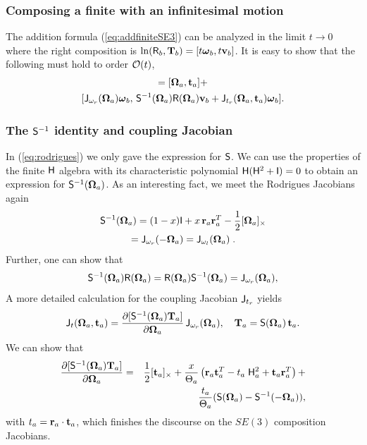\documentclass[conference]{IEEEtran}
\newcommand{\bfomega}{\boldsymbol{\omega}}
\newcommand{\bfOmega}{\boldsymbol{\Omega}}
\newcommand{\beq}{\begin{equation}}
\newcommand{\eeq}{\end{equation}}
\newcommand{\beqar}{\begin{eqnarray}}
\newcommand{\eeqar}{\end{eqnarray}}
\begin{document}
\begin{appendix}
\subsubsection{Composing a finite with an infinitesimal motion}
The addition formula (\ref{eq:addfiniteSE3}) can be analyzed in the limit $t\rightarrow 0$ where the right composition is $\ln ({\sf R}_b,{\bf T}_b) = [t \bfomega_b, t {\bf v}_b]$. It is easy to show that the following must hold to order ${\cal O}(t)$,
\begin{multline}
    [\bfOmega_c,{\bf t}_c] = [\bfOmega_a,{\bf t}_a] + \\
    [{\sf J}_{\omega_r}(\bfOmega_a)\bfomega_b,\, 
    {\sf S}^{-1}(\bfOmega_a){\sf R}(\bfOmega_a){\bf v}_b + {\sf J}_{t_r}(\bfOmega_a,{\bf t}_a)\bfomega_b].
    \label{eq:SE3vectoraddition}
\end{multline}

\subsubsection{The ${\sf S}^{-1}$ identity and coupling Jacobian}
In (\ref{eq:rodrigues}) we only gave the expression for ${\sf S}$. We can use the
properties of the finite ${\sf H}$ algebra with its characteristic polynomial ${\sf H}({\sf H}^2+{\sf I})=0$
to obtain an expression for ${\sf S}^{-1}(\bfOmega_a)$. As an interesting fact, we meet the Rodrigues Jacobians again
\begin{multline}
    {\sf S}^{-1}(\bfOmega_a) = (1-x){\sf I} + x\, {\bf r}_a{\bf r}_a^T - {1\over 2}[\bfOmega_a]_\times \\
    = {\sf J}_{\omega_r}(-\bfOmega_a) = {\sf J}_{\omega_l}(\bfOmega_a)\;.
\end{multline}
Further, one can show that
\beq
    {\sf S}^{-1}(\bfOmega_a){\sf R}(\bfOmega_a) = {\sf R}(\bfOmega_a){\sf S}^{-1}(\bfOmega_a) =
    {\sf J}_{\omega_r}(\bfOmega_a),
\eeq
A more detailed calculation for the coupling Jacobian ${\sf J}_{t_r}$ yields
\beq
    {\sf J}_{t}(\bfOmega_a,{\bf t}_a) = {\partial [{\sf S}^{-1}(\bfOmega_a){\bf T}_a] \over
    \partial \bfOmega_a} \, {\sf J}_{\omega_r}(\bfOmega_a),\quad {\bf T}_a = {\sf S}(\bfOmega_a) \, {\bf t}_a.
\eeq
We can show that
\beqar
    {\partial [{\sf S}^{-1}(\bfOmega_a){\bf T}_a] \over
    \partial \bfOmega_a} & = &
    {1\over 2}[{\bf t}_a]_\times+ {x\over\Theta_a}
    \left( {\bf r}_a{\bf t}_a^T- t_a \;{\sf H}^2_a + {\bf t}_a{\bf r}_a^T \right) + \nonumber \\
    && {t_a\over\Theta_a} ({\sf S}(\bfOmega_a)-{\sf S}^{-1}(-\bfOmega_a)),
\eeqar
with $ t_a = {\bf r}_a\cdot{\bf t}_a$, which finishes the discourse on the $SE(3)$ composition Jacobians.


\end{appendix}
\end{document}
